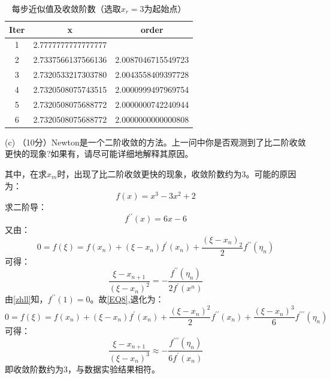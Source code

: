 \documentclass[12pt,a4paper,UTF8]{ctexart}
\begin{document}
\begin{enumerate}
          \begin{table}[H]
              \centering
              \begin{tabular}{|c|c|c|}
                  \hline
                  \textbf{Iter} & \textbf{x}         & \textbf{order}     \\ \hline
                  1             & 2.7777777777777777 &                    \\ \hline
                  2             & 2.7337566137566136 & 2.0087046715549723 \\ \hline
                  3             & 2.7320533217303780 & 2.0043558409397728 \\ \hline
                  4             & 2.7320508075743515 & 2.0000999497969754 \\ \hline
                  5             & 2.7320508075688772 & 2.0000000742240944 \\ \hline
                  6             & 2.7320508075688772 & 2.0000000000000808 \\ \hline
              \end{tabular}
              \caption{每步近似值及收敛阶数（选取$x_{r}=3$为起始点）}
          \end{table}

          (c) （10分）Newton是一个二阶收敛的方法。上一问中你是否观测到了比二阶收敛更快的现象?如果有，请尽可能详细地解释其原因。

          其中，在求$x_{m}$时，出现了比二阶收敛更快的现象，收敛阶数约为3。可能的原因为：
          \begin{equation}
              f(x)=x^{3}-3 x^{2}+2
          \end{equation}
          求二阶导：
          \begin{equation}\label{zhll}
              f^{\prime \prime}(x)=6 x-6
          \end{equation}
          又由：
          \begin{equation}\label{EQ8}
              0=f(\xi )=f(x_{n})+(\xi -x_{n})f^{\prime}(x_{n})+\frac{(\xi -x_{n})_{2}}{2}f^{\prime \prime}(\eta_{n})
          \end{equation}
          可得：
          \begin{equation}
              \frac{\xi - x_{n+1}}{(\xi - x_{n})^{2}} = -\frac {f^{\prime \prime}(\eta_{n})}{2f^{\prime}(x^{n})}
          \end{equation}
          由\eqref{zhll}知，$f^{\prime \prime}(1)=0$。故\eqref{EQ8},退化为：
          \begin{equation}\label{EQ10}
              0=f(\xi )=f(x_{n})+(\xi -x_{n})f^{\prime}(x_{n})+\frac{(\xi -x_{n})^{2}}{2}f^{\prime \prime}(x_{n})+\frac{(\xi -x_{n})^{3}}{6}f^{\prime \prime \prime}(\eta_{n})
          \end{equation}
          可得：
          \begin{equation}
              \frac{\xi - x_{n+1}}{(\xi - x_{n})^{3}} \approx -\frac {f^{\prime \prime \prime}(\eta_{n})}{6f^{\prime}(x_{n})}
          \end{equation}
          即收敛阶数约为3，与数据实验结果相符。


\end{enumerate}
\end{document}

